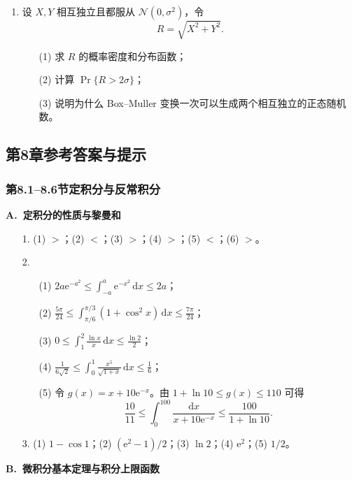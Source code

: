 \documentclass[fontset=fandol]{ctexart}
\newcommand{\dd}{\mathrm{d}}
\newcommand{\ee}{\mathrm{e}}
\begin{document}
\begin{enumerate}
\item 设 $X,Y$ 相互独立且都服从 $\mathcal N(0,\sigma^2)$，令
\[
R=\sqrt{X^2+Y^2}.
\]
\begin{enumerate}
\item[(1)] 求 $R$ 的概率密度和分布函数；
\item[(2)] 计算 $\Pr\{R>2\sigma\}$；
\item[(3)] 说明为什么 Box--Muller 变换一次可以生成两个相互独立的正态随机数。
\end{enumerate}
\end{enumerate}

\subsection*{第8章参考答案与提示}

\subsubsection*{第8.1--8.6节\quad 定积分与反常积分}

\textbf{A.\ 定积分的性质与黎曼和}

\begin{enumerate}
\item[1.] (1) $>$；(2) $<$；(3) $>$；(4) $>$；(5) $<$；(6) $>$。
\item[2.]
\begin{enumerate}
\item[(1)] $\displaystyle 2a\ee^{-a^2}\leq\int_{-a}^a\ee^{-x^2}\,\dd x\leq2a$；
\item[(2)] $\displaystyle \frac{5\pi}{24}\leq\int_{\pi/6}^{\pi/3}(1+\cos^2x)\,\dd x\leq\frac{7\pi}{24}$；
\item[(3)] $\displaystyle 0\leq\int_1^2\frac{\ln x}{x}\,\dd x\leq\frac{\ln2}{2}$；
\item[(4)] $\displaystyle \frac1{6\sqrt2}\leq\int_0^1\frac{x^5}{\sqrt{1+x}}\,\dd x\leq\frac16$；
\item[(5)] 令 $g(x)=x+10\ee^{-x}$。由 $1+\ln10\leq g(x)\leq110$ 可得
\[
\frac{10}{11}\leq\int_0^{100}\frac{\dd x}{x+10\ee^{-x}}
\leq\frac{100}{1+\ln10}.
\]
\end{enumerate}
\item[3.] (1) $1-\cos1$；(2) $\displaystyle (\ee^2-1)/2$；(3) $\ln2$；(4) $\ee^2$；(5) $1/2$。
\end{enumerate}

\textbf{B.\ 微积分基本定理与积分上限函数}
\end{document}
